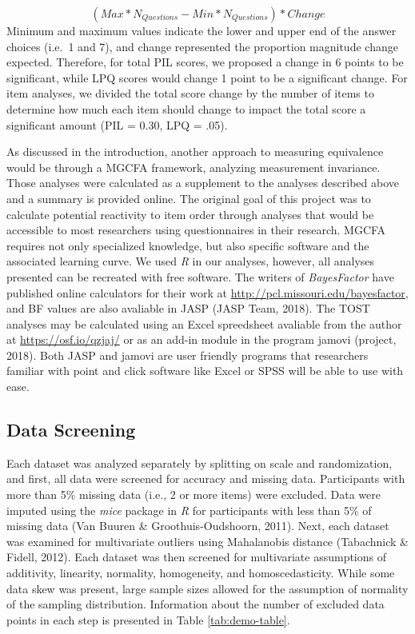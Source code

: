 \documentclass[english,man, mask]{apa6}
\theoremstyle{definition}
\theoremstyle{definition}
\theoremstyle{definition}
\theoremstyle{remark}
\begin{document}
\[
(Max*N_{Questions} - Min*N_{Questions}) * Change
\] Minimum and maximum values indicate the lower and upper end of the
answer choices (i.e.~1 and 7), and change represented the proportion
magnitude change expected. Therefore, for total PIL scores, we proposed
a change in 6 points to be significant, while LPQ scores would change 1
point to be a significant change. For item analyses, we divided the
total score change by the number of items to determine how much each
item should change to impact the total score a significant amount (PIL =
0.30, LPQ = .05).

As discussed in the introduction, another approach to measuring
equivalence would be through a MGCFA framework, analyzing measurement
invariance. Those analyses were calculated as a supplement to the
analyses described above and a summary is provided online. The original
goal of this project was to calculate potential reactivity to item order
through analyses that would be accessible to most researchers using
questionnaires in their research. MGCFA requires not only specialized
knowledge, but also specific software and the associated learning curve.
We used \emph{R} in our analyses, however, all analyses presented can be
recreated with free software. The writers of \emph{BayesFactor} have
published online calculators for their work at
\url{http://pcl.missouri.edu/bayesfactor}, and BF values are also
avaliable in JASP (JASP Team, 2018). The TOST analyses may be calculated
using an Excel spreedsheet avaliable from the author at
\url{https://osf.io/qzjaj/} or as an add-in module in the program jamovi
(project, 2018). Both JASP and jamovi are user friendly programs that
researchers familiar with point and click software like Excel or SPSS
will be able to use with ease.

\subsection{Data Screening}\label{data-screening}

Each dataset was analyzed separately by splitting on scale and
randomization, and first, all data were screened for accuracy and
missing data. Participants with more than 5\% missing data (i.e., 2 or
more items) were excluded. Data were imputed using the \emph{mice}
package in \emph{R} for participants with less than 5\% of missing data
(Van Buuren \& Groothuis-Oudshoorn, 2011). Next, each dataset was
examined for multivariate outliers using Mahalanobis distance
(Tabachnick \& Fidell, 2012). Each dataset was then screened for
multivariate assumptions of additivity, linearity, normality,
homogeneity, and homoscedasticity. While some data skew was present,
large sample sizes allowed for the assumption of normality of the
sampling distribution. Information about the number of excluded data
points in each step is presented in Table \ref{tab:demo-table}.
\end{document}
